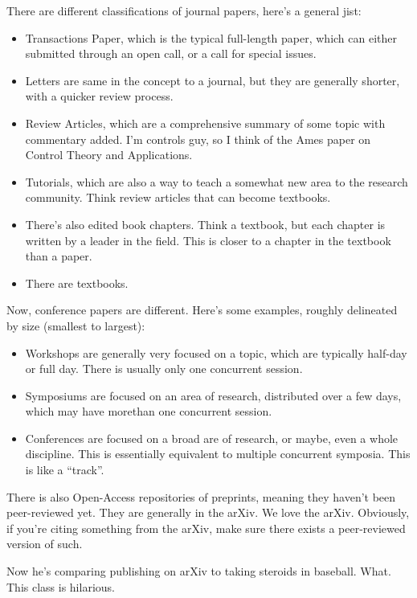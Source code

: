 \documentclass[10pt, oneside]{article}
\begin{document}
There are different classifications of journal papers, here's a general jist:
\begin{itemize}
    \item Transactions Paper, which is the typical full-length paper, which can either submitted through an open call, or a call for special issues.
    \item Letters are same in the concept to a journal, but they are generally shorter, with a quicker review process. 
    \item Review Articles, which are a comprehensive summary of some topic with commentary added. I'm controls guy, so I think of the Ames paper on Control Theory and Applications.
    \item Tutorials, which are also a way to teach a somewhat new area to the research community. Think review articles that can become textbooks. 
    \item There's also edited book chapters. Think a textbook, but each chapter is written by a leader in the field. This is closer to a chapter in the textbook than a paper. 
    \item There are textbooks. 
\end{itemize}

Now, conference papers are different. Here's some examples, roughly delineated by size (smallest to largest):
\begin{itemize}
    \item Workshops are generally very focused on a topic, which are typically half-day or full day. There is usually only one concurrent session.
    \item Symposiums are focused on an area of research, distributed over a few days, which may have morethan one concurrent session.
    \item Conferences are focused on a broad are of research, or maybe, even a whole discipline. This is essentially equivalent to multiple concurrent symposia. This is like a ``track''.
\end{itemize}

There is also Open-Access repositories of preprints, meaning they haven't been peer-reviewed yet. They are generally in the arXiv. We love the arXiv. Obviously, if you're citing something from the arXiv, make sure there exists a peer-reviewed version of such. 

Now he's comparing publishing on arXiv to taking steroids in baseball. What. This class is hilarious. 
\end{document}
